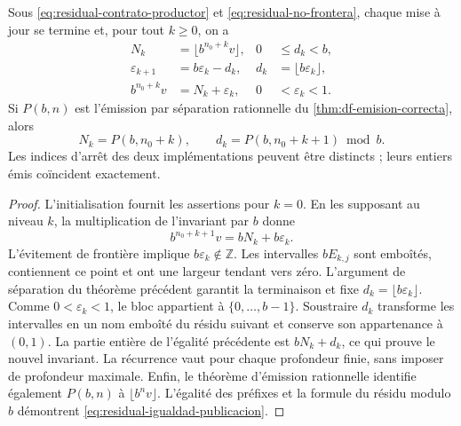 \begin{theorem}
\label{thm:residual-compatibilidad-universal}
Sous \eqref{eq:residual-contrato-productor} et
\eqref{eq:residual-no-frontera}, chaque mise à jour se termine et, pour tout
\(k\geq0\), on a
\begin{align}
 N_k&=\lfloor b^{n_0+k}v\rfloor,
 &0&\leq d_k<b,\label{eq:residual-prefijos-k}\\
 \varepsilon_{k+1}&=b\varepsilon_k-d_k,
 &d_k&=\lfloor b\varepsilon_k\rfloor,\label{eq:residual-recurrencia}\\
 b^{n_0+k}v&=N_k+\varepsilon_k,
 &0&<\varepsilon_k<1.\label{eq:residual-invariante}
\end{align}
Si \(P(b,n)\) est l'émission par séparation rationnelle du
\cref{thm:df-emision-correcta}, alors
\begin{equation}
 N_k=P(b,n_0+k),\qquad
 d_k=P(b,n_0+k+1)\bmod b.
 \label{eq:residual-igualdad-publicacion}
\end{equation}
Les indices d'arrêt des deux implémentations peuvent être distincts ;
leurs entiers émis coïncident exactement.
\end{theorem}
\begin{proof}
L'initialisation fournit les assertions pour \(k=0\). En les supposant
au niveau \(k\), la multiplication de l'invariant par \(b\) donne
\[
 b^{n_0+k+1}v=bN_k+b\varepsilon_k.
\]
L'évitement de frontière implique \(b\varepsilon_k\notin\mathbb Z\).
Les intervalles \(bE_{k,j}\) sont emboîtés, contiennent ce point et ont une
largeur tendant vers zéro. L'argument de séparation du théorème précédent
garantit la terminaison et fixe
\(d_k=\lfloor b\varepsilon_k\rfloor\). Comme
\(0<\varepsilon_k<1\), le bloc appartient à
\(\{0,\ldots,b-1\}\). Soustraire \(d_k\) transforme les intervalles en
un nom emboîté du résidu suivant et conserve son appartenance à
\((0,1)\). La partie entière de l'égalité précédente est
\(bN_k+d_k\), ce qui prouve le nouvel invariant. La récurrence vaut pour
chaque profondeur finie, sans imposer de profondeur maximale.
Enfin, le théorème d'émission rationnelle identifie également
\(P(b,n)\) à \(\lfloor b^n v\rfloor\). L'égalité des
préfixes et la formule du résidu modulo \(b\) démontrent
\eqref{eq:residual-igualdad-publicacion}.
\end{proof}

